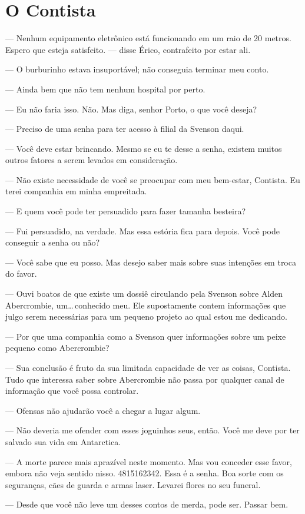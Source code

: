 \chapter{O Contista}


--- Nenhum equipamento eletrônico está funcionando em um raio de 20 metros.
Espero que esteja satisfeito. --- disse Érico, contrafeito por estar ali.

--- O burburinho estava insuportável; não conseguia terminar meu conto.

--- Ainda bem que não tem nenhum hospital por perto.

--- Eu não faria isso. Não. Mas diga, senhor Porto, o que você deseja?

--- Preciso de uma senha para ter acesso à filial da Svenson daqui.

--- Você deve estar brincando. Mesmo se eu te desse a senha, existem muitos
outros fatores a serem levados em consideração.

--- Não existe necessidade de você se preocupar com meu bem-estar, Contista. Eu
terei companhia em minha empreitada.

--- E quem você pode ter persuadido para fazer tamanha besteira?

--- Fui persuadido, na verdade. Mas essa estória fica para depois. Você pode
conseguir a senha ou não?

--- Você sabe que eu posso. Mas desejo saber mais sobre suas intenções em troca
do favor.

--- Ouvi boatos de que existe um dossiê circulando pela Svenson sobre Alden
Abercrombie, um\ldots\,conhecido meu. Ele supostamente contem informações que
julgo serem necessárias para um pequeno projeto ao qual estou me dedicando.

--- Por que uma companhia como a Svenson quer informações sobre um peixe
pequeno como Abercrombie?

--- Sua conclusão é fruto da sua limitada capacidade de ver as coisas,
Contista. Tudo que interessa saber sobre Abercrombie não passa por qualquer
canal de informação que você possa controlar.

--- Ofensas não ajudarão você a chegar a lugar algum.

--- Não deveria me ofender com esses joguinhos seus, então. Você me deve por
ter salvado sua vida em Antarctica.

--- A morte parece mais aprazível neste momento. Mas vou conceder esse favor,
embora não veja sentido nisso. 4815162342. Essa é a senha. Boa sorte com os
seguranças, cães de guarda e armas laser. Levarei flores no seu funeral.

--- Desde que você não leve um desses contos de merda, pode ser. Passar bem.
